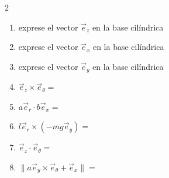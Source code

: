 \begin{multicols}{2}
\begin{enumerate}
    \item exprese el vector $\Vec{e}_z$ en la base cilíndrica 
    \item exprese el vector $\Vec{e}_x$ en la base cilíndrica 
    \item exprese el vector $\Vec{e}_y$ en la base cilíndrica 
    \item $\Vec{e}_z\times\Vec{e}_\theta=$
    \item $a\Vec{e}_r\cdot b\Vec{e}_x=$
    \item $l\Vec{e}_r\times(-mg\Vec{e}_y)=$
    \item $\Vec{e}_z\cdot\Vec{e}_\theta=$
    \item $\|a\Vec{e}_y\times\Vec{e}_\theta+\Vec{e}_x\|=$
    
\end{enumerate}
\end{multicols}

